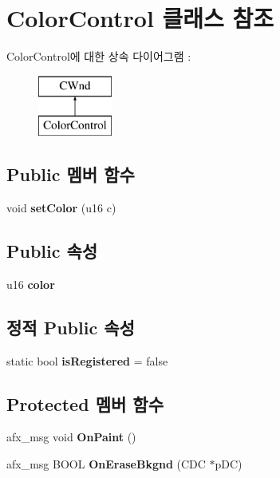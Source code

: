 \hypertarget{class_color_control}{}\section{Color\+Control 클래스 참조}
\label{class_color_control}
Color\+Control에 대한 상속 다이어그램 \+: \begin{figure}[H]
\begin{center}
\leavevmode
\includegraphics[height=2.000000cm]{class_color_control}
\end{center}
\end{figure}
\subsection*{Public 멤버 함수}
\begin{DoxyCompactItemize}
\item 
\mbox{\label{class_color_control_ad4f5b637e57ab4e7c4ed718e66e491eb}} 
void {\bfseries set\+Color} (u16 c)
\end{DoxyCompactItemize}
\subsection*{Public 속성}
\begin{DoxyCompactItemize}
\item 
\mbox{\label{class_color_control_adda78267113753c247e7edcaae47f927}} 
u16 {\bfseries color}
\end{DoxyCompactItemize}
\subsection*{정적 Public 속성}
\begin{DoxyCompactItemize}
\item 
\mbox{\label{class_color_control_a844b865ffc83cf76b50a3f7b0793619e}} 
static bool {\bfseries is\+Registered} = false
\end{DoxyCompactItemize}
\subsection*{Protected 멤버 함수}
\begin{DoxyCompactItemize}
\item 
\mbox{\label{class_color_control_a63bcd96ef7044bf702632cab0fc41eba}} 
afx\+\_\+msg void {\bfseries On\+Paint} ()
\item 
\mbox{\label{class_color_control_a06b4b2fd6e06aab248c7e63859ea4f11}} 
afx\+\_\+msg B\+O\+OL {\bfseries On\+Erase\+Bkgnd} (C\+DC $\ast$p\+DC)
\end{DoxyCompactItemize}


